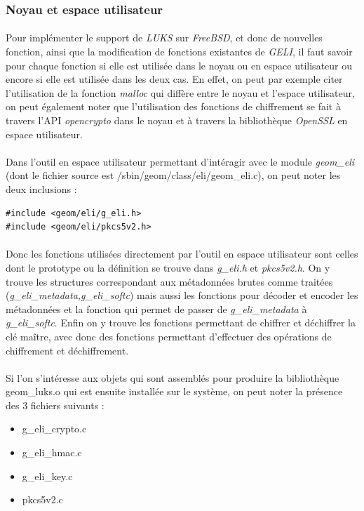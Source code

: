 \subsubsection{Noyau et espace utilisateur}
\paragraph{}
Pour implémenter le support de {\em LUKS} sur {\em FreeBSD}, et donc de nouvelles
fonction, ainsi que la modification de fonctions existantes de {\em GELI}, il
faut savoir pour chaque fonction si elle est utilisée dans le noyau ou en espace
utilisateur ou encore si elle est utilisée dans les deux cas. En effet, on peut
par exemple citer l'utilisation de la fonction {\em malloc} qui diffère entre
le noyau et l'espace utilisateur, on peut également noter que l'utilisation des
fonctions de chiffrement se fait à travers l'API {\em opencrypto} dans le noyau
et à travers la bibliothèque {\em OpenSSL} en espace utilisateur. 

\paragraph{}
Dans l'outil en espace utilisateur permettant d'intéragir avec le module 
{\em geom\_eli} (dont le fichier source est /sbin/geom/class/eli/geom\_eli.c),
on peut noter les deux inclusions :
\begin{lstlisting}
#include <geom/eli/g_eli.h>
#include <geom/eli/pkcs5v2.h>
\end{lstlisting}

\paragraph{}
Donc les fonctions utilisées directement par l'outil en espace utilisateur sont
celles dont le prototype ou la définition se trouve dans {\em g\_eli.h} et
{\em pkcs5v2.h}. On y trouve les structures correspondant aux métadonnées brutes
comme traitées ({\em g\_eli\_metadata,g\_eli\_softc}) mais aussi les fonctions
pour décoder et encoder les métadonnées et la fonction qui permet de passer de
{\em g\_eli\_metadata} à {\em g\_eli\_softc}. Enfin on y trouve les fonctions 
permettant de chiffrer et déchiffrer la clé maître, avec donc des fonctions
permettant d'effectuer des opérations de chiffrement et déchiffrement.


\paragraph{}
Si l'on s'intéresse aux objets qui sont assemblés pour produire la bibliothèque
geom\_luks.o qui est ensuite installée sur le système, on peut noter la présence
des 3 fichiers suivants :
\begin{itemize}
	\item g\_eli\_crypto.c
	\item g\_eli\_hmac.c
	\item g\_eli\_key.c
	\item pkcs5v2.c
\end{itemize}

